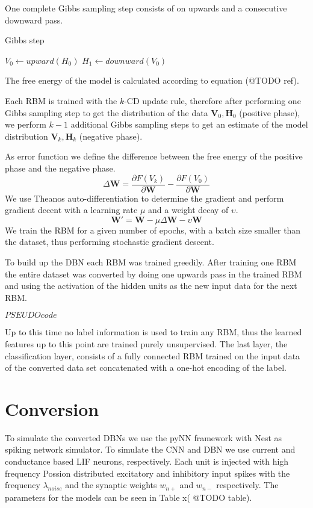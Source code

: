 One complete Gibbs sampling step consists of on upwards and a consecutive downward pass.

\begin{algorithm}
\caption{Gibbs step}
\begin{algorithmic}
\State $V_0 \gets upward(H_0) $  
\State $H_1 \gets downward(V_0) $  
\end{algorithmic}
\end{algorithm}

The free energy of the model is calculated according to equation (@TODO ref).

Each RBM is trained with the $k$-CD update rule, therefore after performing one Gibbs sampling step to get the distribution of the data $\textbf{V}_0, \textbf{H}_0$  (positive phase), we perform $k-1$ additional Gibbs sampling steps to get an estimate of the model distribution $\textbf{V}_k, \textbf{H}_k$  (negative phase).

As error function we define the difference between the free energy of the positive phase and the negative phase.
\[
\Delta \textbf{W} = \frac{\partial F(V_k)}{\partial \textbf{W}} -  \frac{\partial F(V_0)}{\partial \textbf{W}} 
\]
We use Theanos auto-differentiation to determine the gradient and perform gradient decent with a learning rate $\mu$ and a weight decay of $\upsilon$.
\[
\textbf{W}' = \textbf{W} - \mu \Delta \textbf{W} - \upsilon \textbf{W} 
\]
We train the RBM for a given number of epochs, with a batch size smaller than the dataset, thus performing stochastic gradient descent.

To build up the DBN each RBM was trained greedily.
After training one RBM the entire dataset was converted by doing one upwards pass in the trained RBM and using the activation of the hidden units as the new input data for the next RBM.

$PSEUDO code$

Up to this time no label information is used to train any RBM, thus the learned features up to this point are trained purely unsupervised.
The last layer, the classification layer, consists of a fully connected RBM trained on the input data of the converted data set concatenated with a one-hot encoding of the label.



\section{Conversion}

To simulate the converted DBNs we use the pyNN framework with Nest as spiking network simulator.
To simulate the CNN and DBN we use current and conductance based LIF neurons, respectively.
Each unit is injected with high frequency Possion distributed excitatory and inhibitory input spikes with the frequency $\lambda_{noise}$ and the synaptic weights $w_{n+}$ and $w_{n-}$ respectively.
The parameters for the models can be seen in Table x( @TODO table).


